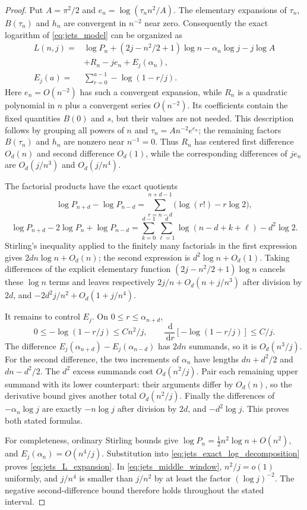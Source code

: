 \documentclass[11pt]{article}
\numberwithin{equation}{section}
\theoremstyle{definition}
\newcommand{\dd}{\,\mathrm d}
\begin{document}
\begin{proof}
Put $A=\pi^2/2$ and
$e_n=\log(\tau_n n^2/A)$.  The elementary expansions of $\tau_n$,
$B(\tau_n)$ and $h_n$ are convergent in $n^{-2}$ near zero.
Consequently the exact logarithm of \eqref{eq:jets_model} can be
organized as
\begin{equation}\label{eq:jets_exact_log_decomposition}
 \begin{split}
 L(n,j)={}&\log P_n+(2j-n^2/2+1)\log n
       -\alpha_n\log j-j\log A\\
       &+R_n-je_n+E_j(\alpha_n),\\
 E_j(a)={}&\sum_{r=0}^{a-1}-\log(1-r/j).
 \end{split}
\end{equation}
Here $e_n=O(n^{-2})$ has such a convergent expansion, while
$R_n$ is a quadratic polynomial in $n$ plus a convergent series
$O(n^{-2})$.  Its coefficients contain the fixed quantities
$B(0)$ and $s$, but their values are not needed.  This description
follows by grouping all powers of $n$ and $\tau_n=A n^{-2}e^{e_n}$;
the remaining factors $B(\tau_n)$ and $h_n$ are nonzero near
$n^{-1}=0$.  Thus $R_n$ has centered first difference $O_d(n)$
and second difference $O_d(1)$, while the corresponding differences
of $je_n$ are $O_d(j/n^3)$ and $O_d(j/n^4)$.

The factorial products have the exact quotients
\[
 \log P_{n+d}-\log P_{n-d}
   =\sum_{r=n-d}^{n+d-1}\bigl(\log(r!)-r\log2\bigr),
\]
\[
 \log P_{n+d}-2\log P_n+\log P_{n-d}
   =\sum_{k=0}^{d-1}\sum_{\ell=1}^{d}
        \log(n-d+k+\ell)-d^2\log2.
\]
Stirling's inequality applied to the finitely many factorials in the
first expression gives $2dn\log n+O_d(n)$; the second expression
is $d^2\log n+O_d(1)$.  Taking differences of the explicit elementary
function $(2j-n^2/2+1)\log n$ cancels these $\log n$ terms and leaves
respectively $2j/n+O_d(n+j/n^3)$ after division by $2d$, and
$-2d^2j/n^2+O_d(1+j/n^4)$.

It remains to control $E_j$.  On $0\le r\le\alpha_{n+d}$,
\[
 0\le-\log(1-r/j)\le Cn^2/j,\qquad
 \frac{\dd}{\dd r}[-\log(1-r/j)]\le C/j.
\]
The difference $E_j(\alpha_{n+d})-E_j(\alpha_{n-d})$ has
$2dn$ summands, so it is $O_d(n^3/j)$.  For the second difference,
the two increments of $\alpha_n$ have lengths
$dn+d^2/2$ and $dn-d^2/2$.  The $d^2$ excess summands cost
$O_d(n^2/j)$.  Pair each remaining upper summand with its lower
counterpart: their arguments differ by $O_d(n)$, so the derivative
bound gives another total $O_d(n^2/j)$.  Finally the differences of
$-\alpha_n\log j$ are exactly $-n\log j$ after division by $2d$,
and $-d^2\log j$.  This proves both stated formulas.

For completeness, ordinary Stirling bounds give
$\log P_n=\tfrac12n^2\log n+O(n^2)$, and
$E_j(\alpha_n)=O(n^4/j)$.  Substitution into
\eqref{eq:jets_exact_log_decomposition} proves
\eqref{eq:jets_L_expansion}.  In \eqref{eq:jets_middle_window},
$n^2/j=o(1)$ uniformly, and $j/n^4$ is smaller than $j/n^2$ by
at least the factor $(\log j)^{-2}$.  The negative second-difference
bound therefore holds throughout the stated interval.
\end{proof}
\end{document}
